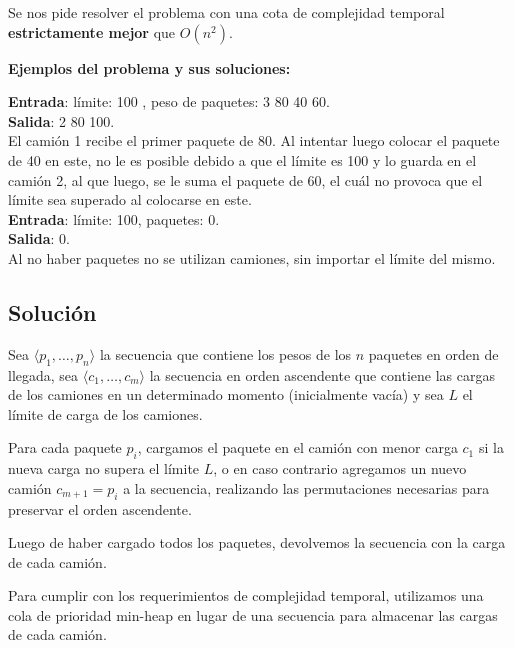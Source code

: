 \documentclass[a4paper, 10pt, twoside]{article}
\begin{document}
Se nos pide resolver el problema con una cota de complejidad temporal \textbf{estrictamente mejor} que $O(n^2)$.

\textbf{Ejemplos del problema y sus soluciones:}

\textbf{Entrada}: límite: 100 , peso de paquetes: 3 80 40 60. \\
\textbf{Salida}: 2 80 100. \\
El camión 1 recibe el primer paquete de 80. Al intentar luego colocar el paquete de 40 en este, no le es posible debido a que el límite es 100 y lo guarda en el camión 2, al que luego, se le suma el paquete de 60, el cuál no provoca que el límite sea superado al colocarse en este.\\

\textbf{Entrada}: límite: 100, paquetes: 0.\\
\textbf{Salida}: 0. \\
Al no haber paquetes no se utilizan camiones, sin importar el límite del mismo.

\subsection{Solución}

Sea $\langle p_1, \ldots, p_n \rangle$ la secuencia que contiene los pesos de los $n$ paquetes en orden de llegada, sea $\langle c_1, \ldots, c_m \rangle$ la secuencia en orden ascendente que contiene las cargas de los camiones en un determinado momento (inicialmente vacía) y sea $L$ el límite de carga de los camiones.

Para cada paquete $p_i$, cargamos el paquete en el camión con menor carga $c_1$ si la nueva carga no supera el límite $L$, o en caso contrario agregamos un nuevo camión $c_{m+1} = p_i$ a la secuencia, realizando las permutaciones necesarias para preservar el orden ascendente.

Luego de haber cargado todos los paquetes, devolvemos la secuencia con la carga de cada camión.

Para cumplir con los requerimientos de complejidad temporal, utilizamos una cola de prioridad min-heap en lugar de una secuencia para almacenar las cargas de cada camión.
\end{document}
